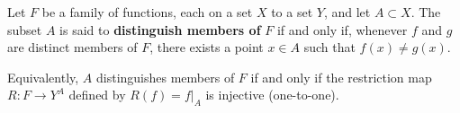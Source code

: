 Let $F$ be a family of functions, each on a set $X$ to a set $Y$, and let $A \subset X$. The subset $A$ is said to \textbf{distinguish members of} $F$ if and only if, whenever $f$ and $g$ are distinct members of $F$, there exists a point $x \in A$ such that $f(x) \neq g(x)$.

Equivalently, $A$ distinguishes members of $F$ if and only if the restriction map $R : F \to Y^A$ defined by $R(f) = f|_A$ is injective (one-to-one).
